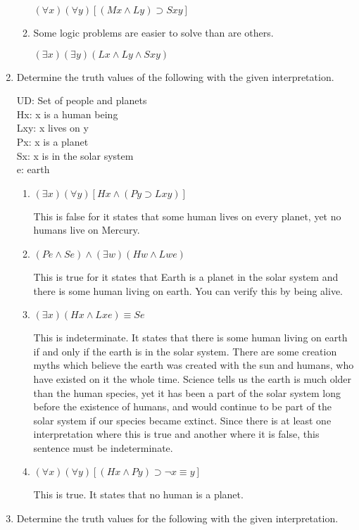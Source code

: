 \documentclass[12pt,letterpaper]{article}
\begin{document}
\begin{enumerate}
\begin{enumerate}
          $(\forall x)(\forall y)[(Mx \land Ly) \supset Sxy]$

        \item Some logic problems are easier to solve than are others.

          $(\exists x)(\exists y)(Lx \land Ly \land Sxy)$
      \end{enumerate}
    \item Determine the truth values of the following with the given interpretation.

      UD: Set of people and planets \\
      Hx: x is a human being \\
      Lxy: x lives on y \\
      Px: x is a planet \\
      Sx: x is in the solar system \\
      e: earth

      \begin{enumerate}
        \item $(\exists x)(\forall y)[Hx \land (Py \supset Lxy)]$

          This is false
          for it states that some human lives on every planet, yet no humans live on Mercury.
        \item $(Pe \land Se) \land (\exists w)(Hw \land Lwe)$

          This is true
          for it states that Earth is a planet in the solar system and there is some human living on earth.
          You can verify this by being alive.
        \item $(\exists x)(Hx \land Lxe) \equiv Se$

          This is indeterminate.
          It states that there is some human living on earth if and only if the earth is in the solar system.
          There are some creation myths which believe the earth was created with the sun and humans, who have existed on it the whole time.
          Science tells us the earth is much older than the human species, yet it has been a part of the solar system long before the existence of humans, and would continue to be part of the solar system if our species became extinct.
          Since there is at least one interpretation where this is true and another where it is false,
          this sentence must be indeterminate.
        \item $(\forall x)(\forall y)[(Hx \land Py) \supset \neg x \equiv y]$

          This is true.
          It states that no human is a planet.
      \end{enumerate}
    \item Determine the truth values for the following with the given interpretation.


\end{enumerate}
\end{document}
